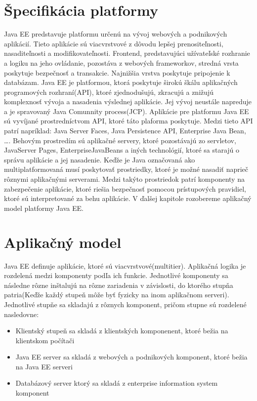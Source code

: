 \section{Špecifikácia platformy}
Java EE  predstavuje platformu určenú na vývoj webových a podnikových aplikácií\cite{fitWeb}. Tieto aplikácie sú viacvrstvové z dôvodu lepšej prenositeľnosti, nasaditeľnosti a modifikovateľnosti. Frontend, predstavujúci užívateľské rozhranie a logiku na jeho ovládanie, pozostáva z webových frameworkov, stredná vrsta poskytuje bezpečnosť a transakcie. Najnižšia vrstva poskytuje pripojenie k databázam. Java EE je platformou, ktorá poskytuje širokú škálu aplikačných programových rozhraní(API), ktoré zjednodušujú, zkracujú a znižujú komplexnosť vývoja a nasadenia výslednej aplikácie. Jej vývoj neustále napreduje a je spravovaný Java Comunnity process(JCP). Aplikácie pre platformu Java EE sú vyvíjané prostredníctvom API, ktoré táto plaforma poskytuje. Medzi tieto API patrí napríklad: Java Server Faces, Java Persistence API, Enterprise Java Bean, \ldots.  Behovým prostredím sú aplikačné servery, ktoré pozostávajú zo servletov, JavaServer Pages, EnterpriseJavaBeans a iných technológií, ktoré sa starajú o správu aplikácie a jej nasadenie. Keďže je Java označovaná ako multiplatformovaná musí poskytovať prostriedky, ktoré je možné nasadiť naprieč rôznymi aplikačnými serverami. Medzi takýto prostriedok patrí komponenty na zabezpečenie aplikácie, ktoré riešia bezpečnosť pomocou prístupových pravidiel, ktoré sú interpretované za behu aplikácie.
V ďalšej kapitole rozobereme aplikačný model platformy Java EE.  


\section{Aplikačný model}
Java EE definuje aplikácie, ktoré sú viacvrstvové(multitier). Aplikačná logika je rozdelená medzi komponenty podľa ich funkcie\cite{Pravidla}. Jednotlivé komponenty sa následne rôzne inštalujú na rôzne zariadenia v závislosti, do ktorého stupňa patria(Keďže každý stupeň môže byť fyzicky na inom aplikačnom serveri). Jednotlivé stupňe sa skladajú z rôznych komponent, pričom stupne sú rozdelené nasledovne:
\begin{itemize}
\item Klientský stupeň sa skladá z klientských komponenent, ktoré bežia na klientskom počítači
\item Java EE server sa skladá z webových a podnikových komponent, ktoré bežia na Java EE serveri
\item Databázový server ktorý sa skladá z enterprise information system komponent
\end{itemize}

